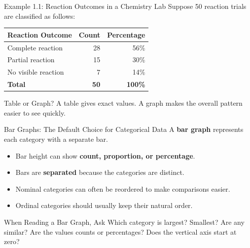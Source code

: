 \documentclass[aspectratio=169]{beamer}
\begin{document}
\begin{frame}{Example 1.1: Reaction Outcomes in a Chemistry Lab}
  Suppose 50 reaction trials are classified as follows:
  \begin{table}
    \centering
    \begin{tabular}{lrr}
      \toprule
      \textbf{Reaction Outcome} & \textbf{Count} & \textbf{Percentage} \\
      \midrule
      Complete reaction & 28 & 56\% \\
      Partial reaction & 15 & 30\% \\
      No visible reaction & 7 & 14\% \\
      \midrule
      \textbf{Total} & \textbf{50} & \textbf{100\%} \\
      \bottomrule
    \end{tabular}
  \end{table}
  \begin{block}{Table or Graph?}
    A table gives exact values. A graph makes the overall pattern easier to see quickly.
  \end{block}
\end{frame}

\begin{frame}{Bar Graphs: The Default Choice for Categorical Data}
  A \textbf{bar graph} represents each category with a separate bar.
  \begin{itemize}
    \item Bar height can show \textbf{count, proportion, or percentage}.
    \item Bars are \textbf{separated} because the categories are distinct.
    \item Nominal categories can often be reordered to make comparisons easier.
    \item Ordinal categories should usually keep their natural order.
  \end{itemize}
  \vspace{0.15cm}
  \begin{alertblock}{When Reading a Bar Graph, Ask}
    Which category is largest? Smallest? Are any similar? Are the values counts or percentages? Does the vertical axis start at zero?
  \end{alertblock}
\end{frame}
\end{document}
